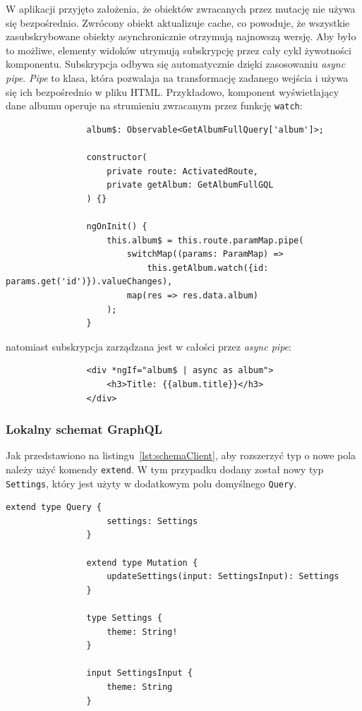 			W aplikacji przyjęto założenia, że obiektów zwracanych przez mutację nie używa się bezpośrednio.
			Zwrócony obiekt aktualizuje cache, co powoduje, że wszystkie zasubskrybowane obiekty asynchronicznie otrzymują najnowszą wersję.
			Aby było to możliwe, elementy widoków utrymują subskrypcję przez cały cykl żywotności komponentu.
			Subskrypcja odbywa się automatycznie dzięki zasosowaniu \emph{async pipe}.
			\emph{Pipe} to klasa, która pozwalaja na transformację zadanego wejścia i używa się ich bezpośrednio w pliku HTML.
			Przykładowo, komponent wyświetlający dane albumu operuje na strumieniu zwracanym przez funkcję \verb|watch|:
			\begin{lstlisting}
				album$: Observable<GetAlbumFullQuery['album']>;

				constructor(
					private route: ActivatedRoute,
					private getAlbum: GetAlbumFullGQL
				) {}

				ngOnInit() {
					this.album$ = this.route.paramMap.pipe(
						switchMap((params: ParamMap) =>
							this.getAlbum.watch({id: params.get('id')}).valueChanges),
						map(res => res.data.album)
					);
				}
			\end{lstlisting}
			natomiast subskrypcja zarządzana jest w całości przez \emph{async pipe}:
			\begin{lstlisting}
				<div *ngIf="album$ | async as album">
					<h3>Title: {{album.title}}</h3>
				</div>
			\end{lstlisting}

		\subsubsection*{Lokalny schemat GraphQL}
			Jak przedstawiono na listingu~\ref{lst:schemaClient}, aby rozszerzyć typ o nowe pola należy użyć komendy \verb|extend|.
			W tym przypadku dodany został nowy typ \verb|Settings|, który jest użyty w dodatkowym polu domyślnego \verb|Query|.
			\begin{lstlisting}[label=lst:schemaClient, caption=Lokalny schemat GraphQL, float=th]
				extend type Query {
					settings: Settings
				}
				
				extend type Mutation {
					updateSettings(input: SettingsInput): Settings
				}
				
				type Settings {
					theme: String!
				}
				
				input SettingsInput {
					theme: String
				}
				
			\end{lstlisting}
			
